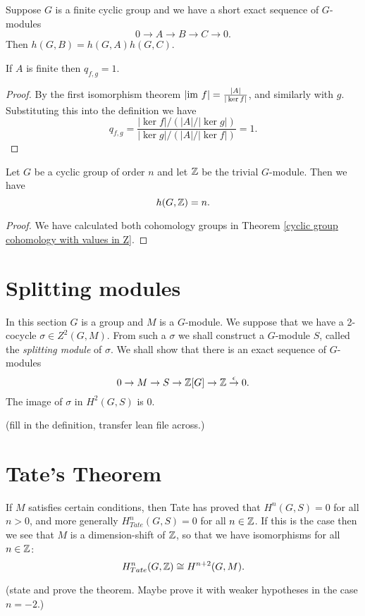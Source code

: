 \begin{corollary}
  Suppose $G$ is a finite cyclic group and we have a short exact sequence of $G$-modules
  \[
    0 \to A \to B \to C \to 0.
  \]
  Then $h(G,B) = h(G,A) h(G,C)$.
\end{corollary}

\begin{theorem}
  \label{Herbrand of finite}
  If $A$ is finite then $q_{f,g} = 1$.
\end{theorem}

\begin{proof}
  By the first isomorphism theorem $|\mathrm {im}\  f| = \frac{|A|}{|\ker f|}$, and similarly with $g$.
  Substituting this into the definition we have
  \[
    q_{f,g} = \frac{|\ker f| / (|A| / |\ker g|)}{|\ker g| / (|A| / |\ker f|)}
    = 1.
  \]
\end{proof}

\begin{lemma}
  Let $G$ be a cyclic group of order $n$ and let $\mathbb Z$ be the trivial $G$-module.
  Then we have
  \[
    h(G,\mathbb Z) = n.
  \]
\end{lemma}

\begin{proof}
  We have calculated both cohomology groups in
  Theorem \ref{cyclic group cohomology with values in Z}.
\end{proof}


\section{Splitting modules}

In this section $G$ is a group and $M$ is a $G$-module.
We suppose that we have a 2-cocycle $\sigma \in Z^2(G,M)$.
From such a $\sigma$ we shall construct a $G$-module $S$, called the \emph{splitting module} of
$\sigma$.
We shall show that there is an exact sequence of $G$-modules
\[
  0 \to M \to S \to \mathbb Z[G] \to \mathbb Z \stackrel{\epsilon}\to 0.
\]
The image of $\sigma$ in $H^2(G,S)$ is $0$.

(fill in the definition, transfer lean file across.)


\section{Tate's Theorem}

If $M$ satisfies certain conditions, then Tate has proved that $H^n(G,S)=0$ for all $n>0$,
and more generally $H^n_{Tate}(G,S)=0$ for all $n \in \mathbb Z$.
If this is the case then we see that $M$ is a dimension-shift of $\mathbb Z$, so that we have
isomorphisms for all $n \in \mathbb Z$:
\[
  H^n_{Tate}(G,\mathbb Z) \cong H^{n+2}(G,M).
\]

(state and prove the theorem. Maybe prove it with weaker hypotheses in the case $n=-2$.)
